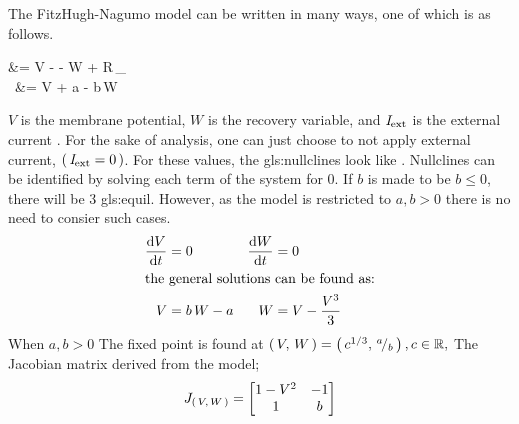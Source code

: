 \documentclass[class={myRUCProject}, crop=false]{standalone}
\begin{document}
The FitzHugh-Nagumo model can be written in many ways, one of which is as follows.
\begin{sysEquation}
     &= V -  - W + R\,\curr_{} \\
    \phi \,  &= V + a - b\,W
\end{sysEquation}

\(V\) is the membrane potential, \(W\) is the recovery variable, and \(\mathit{I}_{\mathrm{ext}}\) is the external current \cite{Sherwood2014}. 
For the sake of analysis, one can just choose to not apply external current, \(\left(\,\mathit{I}_{\mathrm{ext}} = 0\,\right)\).
For these values, the \glspl{gls:nullcline} look like . 
Nullclines can be identified by solving each term of the system for 0. 
If \(b\) is made to be \(b\leq0\), there will be 3 \gls{gls:equil}. However, as the model is restricted to \(a,b>0\) there is no need to consier such cases. 
\begin{align}
    \ode{V} &= 0 & \ode{W} &= 0\\
    \intertext{the general solutions can be found as:} 
    V &= b\,W - a &  W &= V - \frac{V^3}{3} %
\end{align}
When \(a,b>0\) The fixed point is found at \(\left(\,V,\,W\,\right) = \left(\,c^{1/3},\,{}^{a}\!/_{b}\,\right), c\in\mathbb{R},\) 
The Jacobian matrix derived from the model; 
\begin{equation}
    J_{\left(\,V,\,W\,\right)} = 
    \begin{bmatrix}
        1 - V^2 & -1 \\
        1 & b
    \end{bmatrix}    
\end{equation}



\end{document}
